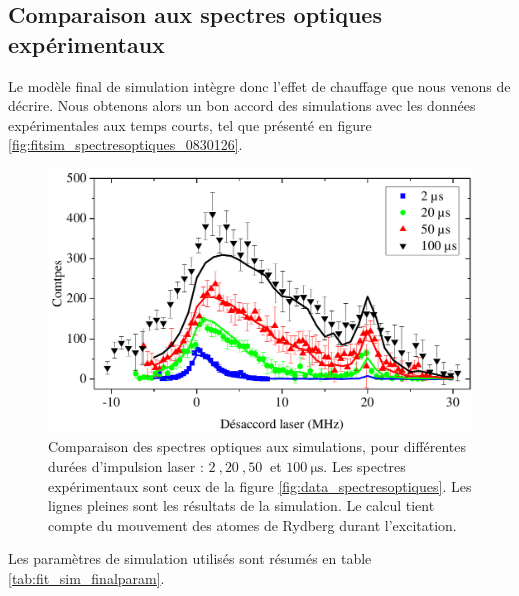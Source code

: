 \subsection{Comparaison aux spectres optiques expérimentaux}
\noindent Le modèle final de simulation intègre donc l'effet de chauffage que nous venons de décrire.
Nous obtenons alors un bon accord des simulations avec les données expérimentales aux temps courts, tel que présenté en figure \eqref{fig:fitsim_spectresoptiques_0830126}.
%
\begin{figure}[!h]
\centering
\includegraphics[width=\linewidth]{figures/low_l/fitsim_spectresoptiques_0830126}
\caption[Comparaison des spectres optiques aux simulations avec équations de taux]{
Comparaison des spectres optiques aux simulations, pour différentes durées d'impulsion laser : $\SI{2}{},\SI{20}{},\SI{50}{}$ et $\SI{100}{\us}$.
Les spectres expérimentaux sont ceux de la figure \ref{fig:data_spectresoptiques}.
Les lignes pleines sont les résultats de la simulation.
Le calcul tient compte du mouvement des atomes de Rydberg durant l'excitation.
}
\label{fig:fitsim_spectresoptiques_0830126}
\end{figure}
%
Les paramètres de simulation utilisés sont résumés en table \eqref{tab:fit_sim_finalparam}.
%
